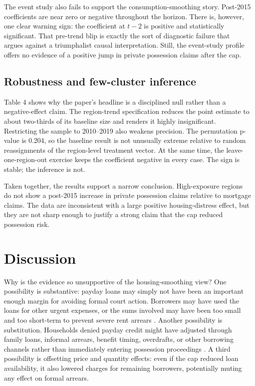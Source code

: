 \documentclass[12pt]{article}
\begin{document}


The event study also fails to support the consumption-smoothing story. Post-2015 coefficients are near zero or negative throughout the horizon. There is, however, one clear warning sign: the coefficient at $t-2$ is positive and statistically significant. That pre-trend blip is exactly the sort of diagnostic failure that argues against a triumphalist causal interpretation. Still, the event-study profile offers no evidence of a positive jump in private possession claims after the cap.

\subsection{Robustness and few-cluster inference}



Table 4 shows why the paper's headline is a disciplined null rather than a negative-effect claim. The region-trend specification reduces the point estimate to about two-thirds of its baseline size and renders it highly insignificant. Restricting the sample to 2010--2019 also weakens precision. The permutation p-value is 0.204, so the baseline result is not unusually extreme relative to random reassignments of the region-level treatment vector. At the same time, the leave-one-region-out exercise keeps the coefficient negative in every case. The sign is stable; the inference is not.

Taken together, the results support a narrow conclusion. High-exposure regions do not show a post-2015 increase in private possession claims relative to mortgage claims. The data are inconsistent with a large positive housing-distress effect, but they are not sharp enough to justify a strong claim that the cap reduced possession risk.

\section{Discussion}

Why is the evidence so unsupportive of the housing-smoothing view? One possibility is substantive: payday loans may simply not have been an important enough margin for avoiding formal court action. Borrowers may have used the loans for other urgent expenses, or the sums involved may have been too small and too short-term to prevent severe rent arrears \citep{bhutta2014, bhutta2015}. Another possibility is substitution. Households denied payday credit might have adjusted through family loans, informal arrears, benefit timing, overdrafts, or other borrowing channels rather than immediately entering possession proceedings \citep{zinman2010, morse2011}. A third possibility is offsetting price and quantity effects: even if the cap reduced loan availability, it also lowered charges for remaining borrowers, potentially muting any effect on formal arrears.
\end{document}
